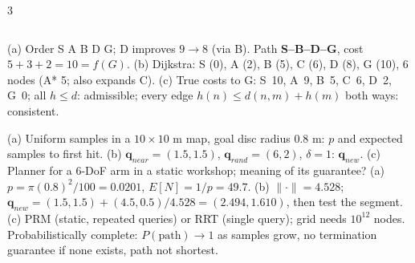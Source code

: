 \begin{multicols}{3}
\begin{examq}
\begin{tabularx}{\linewidth}{@{}rcccc>{\raggedright\arraybackslash}X@{}}
\bottomrule\end{tabularx}\par\vspace{1pt}\small
(a) Order S A B D G; D improves $9\to8$ (via B). Path \textbf{S--B--D--G}, cost $5+3+2=\boxed{10}=f(G)$. 
(b) Dijkstra: S (0), A (2), B (5), C (6), D (8), G (10), 6 nodes (A* 5; also expands C). 
(c) True costs to G: S~10, A~9, B~5, C~6, D~2, G~0; all $h\le d$: admissible; every edge $h(n)\le d(n,m)+h(m)$ both ways: consistent. \ \chk
\end{examq}
\begin{examq}
(a) Uniform samples in a $10\times10$ m map, goal disc radius 0.8 m: $p$ and expected samples to first hit. (b) $\mathbf q_{near}=(1.5,1.5)$, $\mathbf q_{rand}=(6,2)$, $\delta=1$: $\mathbf q_{new}$. (c) Planner for a 6-DoF arm in a static workshop; meaning of its guarantee?
\solution
(a) $p=\pi(0.8)^2/100=0.0201$, $E[N]=1/p=49.7$. 
(b) $\lVert\cdot\rVert=4.528$; $\mathbf q_{new}=(1.5,1.5)+(4.5,0.5)/4.528=\boxed{(2.494,1.610)}$, then test the segment. 
(c) PRM (static, repeated queries) or RRT (single query); grid needs $10^{12}$ nodes. Probabilistically complete: $P(\text{path})\to1$ as samples grow, no termination guarantee if none exists, path not shortest. \ \chk
\end{examq}
\end{multicols}
